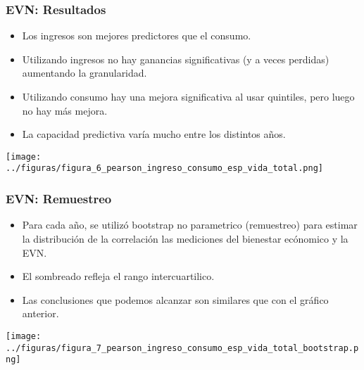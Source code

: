 \documentclass[10pt,mathserif]{beamer}%
\begin{document}
\begin{frame}
    \frametitle{EVN: Resultados}
    \begin{multicols}{2}
        \begin{minipage}{\linewidth}
            \begin{itemize}
                \item Los ingresos son mejores predictores que el consumo.
                \item Utilizando ingresos no hay ganancias significativas (y a veces perdidas) aumentando la granularidad.
                \item Utilizando consumo hay una mejora significativa al usar quintiles, pero luego no hay más mejora.
                \item La capacidad predictiva varía mucho entre los distintos años.
            \end{itemize}\end{minipage}
        \begin{minipage}{\linewidth}
            \centering
            \texttt{[image: ../figuras/figura\_6\_pearson\_ingreso\_consumo\_esp\_vida\_total.png]} %
        \end{minipage}

    \end{multicols}
\end{frame}

\begin{frame}
    \frametitle{EVN: Remuestreo}
    \begin{multicols}{2}
        \begin{minipage}{\linewidth}
            \begin{itemize}
                \item Para cada año, se utilizó bootstrap no parametrico (remuestreo) para estimar la distribución de la correlación las mediciones del bienestar ecónomico y la EVN.
            
                \item El sombreado refleja el rango intercuartilico. 

                \item Las conclusiones que podemos alcanzar son similares que con el gráfico anterior.
            \end{itemize}\end{minipage}
        \begin{minipage}{\linewidth}
            \centering
            \texttt{[image: ../figuras/figura\_7\_pearson\_ingreso\_consumo\_esp\_vida\_total\_bootstrap.png]} %
        \end{minipage}

    \end{multicols}

\end{frame}
\end{document}
